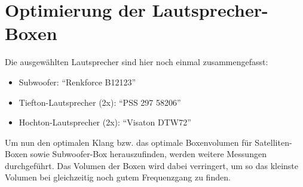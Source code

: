 \newpage
\section{Optimierung der Lautsprecher-Boxen}\label{sec:4.4}
Die ausgewählten Lautsprecher sind hier noch einmal zusammengefasst:
\begin{itemize}
	\item Subwoofer: \enquote{Renkforce B12123}
	\item Tiefton-Lautsprecher (2x): \enquote{PSS 297 58206}
	\item Hochton-Lautsprecher (2x): \enquote{Visaton DTW72}
\end{itemize}
Um nun den optimalen Klang bzw. das optimale Boxenvolumen für Satelliten-Boxen sowie Subwoofer-Box herauszufinden, werden weitere Messungen durchgeführt.
Das Volumen der Boxen wird dabei verringert, um so das kleinste Volumen bei gleichzeitig noch gutem Frequenzgang zu finden.

